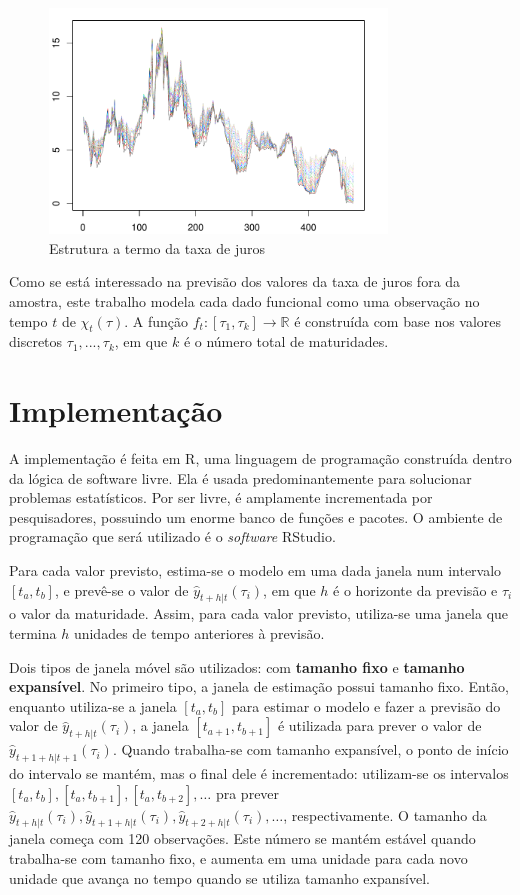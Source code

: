 \documentclass[
	12pt,				%
	openright,			%
	oneside,			%
	a4paper,			%
	english,			%
	brazil				%
	]{dissertacao-ufrgs-abntex2}
\begin{document}
\begin{figure}[h!] 
  \centering
    \includegraphics[width=0.8\textwidth]{anexos/taxas_juro}
  \caption{Estrutura a termo da taxa de juros}
  \label{fig:est-termo}
\end{figure}

Como se está interessado na previsão dos valores da taxa de juros fora da amostra, este trabalho modela cada dado funcional como uma observação no tempo $t$ de $\chi_t(\tau)$. A função $f_t:[\tau_1,\tau_k] \rightarrow \mathbb{R}$ é construída com base nos valores discretos ${\tau_1, ..., \tau_k}$, em que $k$ é o número total de maturidades. 

\section{Implementação}

A implementação é feita em R, uma linguagem de programação construída dentro da lógica de software livre. Ela é usada predominantemente para solucionar problemas estatísticos. Por ser livre, é amplamente incrementada por pesquisadores, possuindo um enorme banco de funções e pacotes. O ambiente de programação que será utilizado é o \emph{software} RStudio.

Para cada valor previsto, estima-se o modelo em uma dada janela num intervalo $[t_a,t_b]$, e prevê-se o valor de  $\hat{y}_{t+h|t}(\tau_i)$, em que $h$ é o horizonte da previsão e $\tau_i$ o valor da maturidade. Assim, para cada valor previsto, utiliza-se uma janela que termina $h$ unidades de tempo anteriores à previsão.

Dois tipos de janela móvel são utilizados: com \textbf{tamanho fixo} e \textbf{tamanho expansível}. 
No primeiro tipo, a janela de estimação possui tamanho fixo. Então, enquanto utiliza-se a janela $[t_a,t_b]$ para estimar o modelo e fazer a previsão do valor de $\hat{y}_{t+h|t}(\tau_i)$, a janela $[t_{a+1},t_{b+1}]$ é utilizada para prever o valor de $\hat{y}_{t+1+h|t+1}(\tau_i)$. Quando trabalha-se com tamanho expansível, o ponto de início do intervalo se mantém, mas o final dele é incrementado: utilizam-se os intervalos $[t_{a},t_{b}] ,[t_{a},t_{b+1}],[t_{a},t_{b+2}],\dots$  pra prever $\hat{y}_{t+h|t}(\tau_i),\hat{y}_{t+1+h|t}(\tau_i),\hat{y}_{t+2+h|t}(\tau_i),\dots$, respectivamente. O tamanho da janela começa com 120 observações. Este número se mantém estável quando trabalha-se com tamanho fixo, e aumenta em uma unidade para cada novo unidade que avança no tempo quando se utiliza tamanho expansível.
\end{document}
